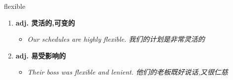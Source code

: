 
\begin{frame}
{\huge flexible}
\begin{center}
\begin{enumerate}\Large
  \item \textbf{adj. 灵活的,可变的}
  \begin{itemize}
    \item \em{\Large{Our schedules are highly flexible. 我们的计划是非常灵活的}}
  \end{itemize}
  \item \textbf{adj. 易受影响的}
  \begin{itemize}
    \item \em{\Large{Their boss was flexible and lenient. 他们的老板既好说话,又很仁慈}}
  \end{itemize}
\end{enumerate}
\end{center}
\end{frame}
